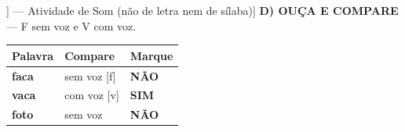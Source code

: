 \begin{exercicio}[Som /f/ [[f]] --- Atividade de Som (não de letra nem de sílaba)]
\textbf{D) OUÇA E COMPARE} --- F sem voz e V com voz.

\begin{center}
\begin{tabular}{@{}p{4.2cm}p{6.2cm}p{1.6cm}@{}}
\hline
\textbf{Palavra} & \textbf{Compare} & \textbf{Marque} \\
\hline
\textbf{faca} & sem voz [f] & \textbf{NÃO} \\
\textbf{vaca} & com voz [v] & \textbf{SIM} \\
\textbf{foto} & sem voz & \textbf{NÃO} \\
\hline
\end{tabular}
\end{center}

\end{exercicio}


